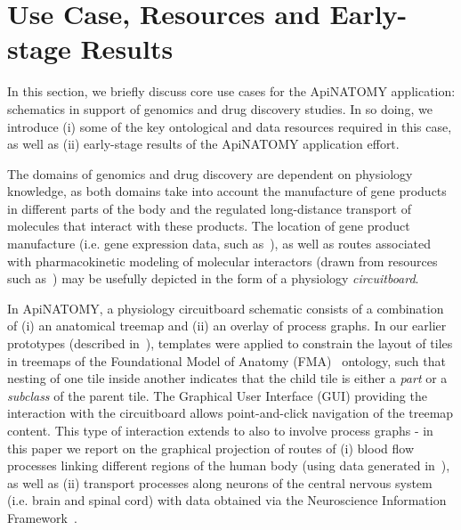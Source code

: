 \section{Use Case, Resources and Early-stage Results} \label{sect:motivation}            %

In this section, we briefly discuss core use cases for the ApiNATOMY application: schematics in support of genomics and drug discovery studies. In so doing, we introduce (i) some of the key ontological and data resources required in this case, as well as (ii) early-stage results of the ApiNATOMY application effort.

The domains of genomics and drug discovery are dependent on physiology knowledge, as both domains take into account the manufacture of gene products in different parts of the body and the regulated long-distance transport of molecules that interact with these products. The location of gene product manufacture (i.e. gene expression data, such as~\cite{EBI}), as well as routes associated with pharmacokinetic modeling of molecular interactors (drawn from resources such as~\cite{HMC+13}) may be usefully depicted in the form of a physiology \emph{circuitboard}.

In ApiNATOMY, a physiology circuitboard schematic consists of a combination of (i) an anatomical treemap and (ii) an overlay of process graphs. In our earlier prototypes (described in~\cite{BGS12,KBK14}), templates were applied to constrain the layout of tiles in treemaps of the Foundational Model of Anatomy (FMA)~\cite{RM03} ontology, such that nesting of one tile inside another indicates that the child tile is either a \emph{part} or a \emph{subclass} of the parent tile. The Graphical User Interface (GUI) providing the interaction with the circuitboard allows point-and-click navigation of the treemap content. This type of interaction extends to also to involve process graphs - in this paper we report on the graphical projection of routes of (i) blood flow processes linking different regions of the human body (using data generated in~\cite{deB11}), as well as (ii) transport processes along neurons of the central nervous system (i.e. brain and spinal cord) with data obtained via the Neuroscience Information Framework~\cite{Gar+08}.

